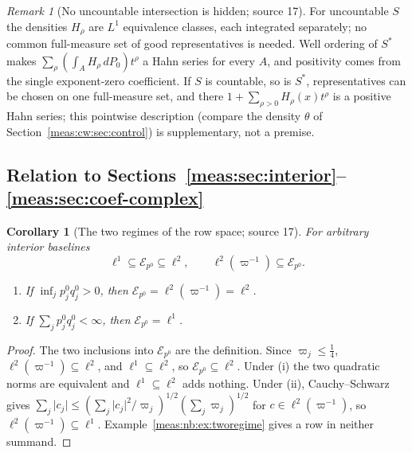 \documentclass[11pt]{article}
\numberwithin{equation}{section}
\newtheorem{corollary}[theorem]{Corollary}
\theoremstyle{definition}
\theoremstyle{remark}
\newtheorem{remark}[theorem]{Remark}
\newcommand{\abs}[1]{\lvert#1\rvert}
\newcommand{\Erow}{\mathcal E_{p^0}}
\begin{document}
\begin{remark}[No uncountable intersection is hidden; source 17]
\label{meas:nb:rem:uncountable}
For uncountable $S$ the densities $H_\rho$ are $L^1$ equivalence classes, each
integrated separately; no common full-measure set of good representatives is
needed. Well ordering of $S^*$ makes $\sum_\rho(\int_AH_\rho\,dP_0)t^\rho$ a Hahn series for
every $A$, and positivity comes from the single exponent-zero coefficient. If $S$
is countable, so is $S^*$, representatives can be chosen on one full-measure set,
and there $1+\sum_{\rho>0}H_\rho(x)t^\rho$ is a positive Hahn series; this pointwise
description (compare the density $\theta$ of Section~\ref{meas:cw:sec:control}) is
supplementary, not a premise.
\end{remark}

\subsection{Relation to Sections~\ref{meas:sec:interior}--\ref{meas:sec:coef-complex}}
\label{meas:nb:sub:relation}

\begin{corollary}[The two regimes of the row space; source 17]
\label{meas:nb:cor:regimes}
For arbitrary interior baselines
\[
 \ell^1\subseteq\Erow\subseteq\ell^2,\qquad \ell^2(\varpi^{-1})\subseteq\Erow .
\]
\begin{enumerate}[label=(\roman*)]
\item If $\inf_jp_j^0q_j^0>0$, then $\Erow=\ell^2(\varpi^{-1})=\ell^2$.
\item If $\sum_jp_j^0q_j^0<\infty$, then $\Erow=\ell^1$.
\end{enumerate}
\end{corollary}
\begin{proof}
The two inclusions into $\Erow$ are the definition. Since $\varpi_j\le\frac14$,
$\ell^2(\varpi^{-1})\subseteq\ell^2$, and $\ell^1\subseteq\ell^2$, so $\Erow\subseteq\ell^2$.
Under (i) the two quadratic norms are equivalent and $\ell^1\subseteq\ell^2$ adds
nothing. Under (ii), Cauchy--Schwarz gives
$\sum_j\abs{c_j}\le(\sum_j\abs{c_j}^2/\varpi_j)^{1/2}(\sum_j\varpi_j)^{1/2}$ for
$c\in\ell^2(\varpi^{-1})$, so $\ell^2(\varpi^{-1})\subseteq\ell^1$.
Example~\ref{meas:nb:ex:tworegime} gives a row in neither summand.
\end{proof}
\end{document}
